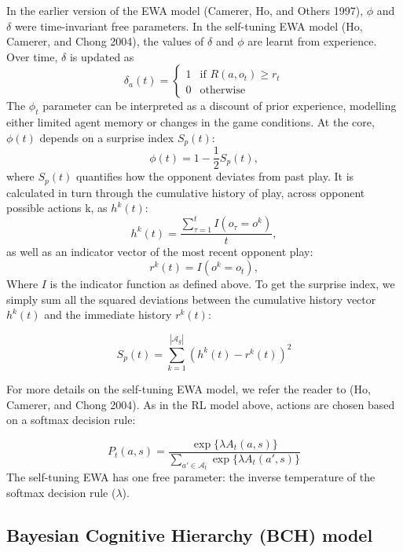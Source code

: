 \documentclass[smallextended]{svjour3}       %
\begin{document}
In the earlier version of the EWA model (Camerer, Ho, and Others 1997),
\(\phi\) and \(\delta\) were time-invariant free parameters. In the
self-tuning EWA model (Ho, Camerer, and Chong 2004), the values of
\(\delta\) and \(\phi\) are learnt from experience. Over time,
\(\delta\) is updated as
\[\delta_{a}(t) = \begin{cases} 1 & \text{if }  R(a,o_{t}) \geq r_{t}  \\
0 & \text{otherwise} \end{cases}\] The \(\phi_{t}\) parameter can be
interpreted as a discount of prior experience, modelling either limited
agent memory or changes in the game conditions. At the core, \(\phi(t)\)
depends on a surprise index \(S_{p}(t)\):
\[\phi(t) = 1 - \frac{1}{2}S_{p}(t) ,\] where \(S_{p}(t)\) quantifies
how the opponent deviates from past play. It is calculated in turn
through the cumulative history of play, across opponent possible actions
k, as \(h^{k}(t)\):
\[h^{k}(t)= \frac{ \sum_{\tau = 1}^t  I( o_{\tau} = o^k )} {t}, \] as
well as an indicator vector of the most recent opponent play:
\[r^k(t) = I(o^k=o_{t}), \] Where \(I\) is the indicator function as
defined above. To get the surprise index, we simply sum all the squared
deviations between the cumulative history vector \(h^{k}(t)\) and the
immediate history \(r^k(t)\):

\[S_{p}(t) = \sum_{k=1}^{|\mathcal{A}_g|} (h^{k}(t) - r^k(t))^2 \]

For more details on the self-tuning EWA model, we refer the reader to
(Ho, Camerer, and Chong 2004). As in the RL model above, actions are
chosen based on a softmax decision rule:

\[P_t(a,s) = \frac{\exp \{\lambda  A_{t}(a,s) \} }{\sum_{a' \in \mathcal{A}_t} \exp \{ \lambda A_{t}(a',s) \} } \]
The self-tuning EWA has one free parameter: the inverse temperature of
the softmax decision rule (\(\lambda\)).

\hypertarget{bayesian-cognitive-hierarchy-bch-model}{%
\subsection{Bayesian Cognitive Hierarchy (BCH)
model}\label{bayesian-cognitive-hierarchy-bch-model}}
\end{document}
